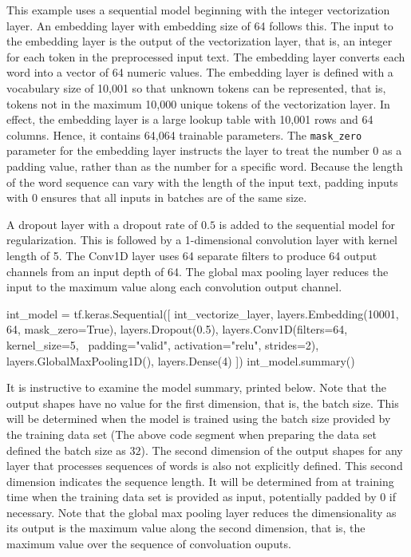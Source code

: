 \begin{withcode}
This example uses a sequential model beginning with the integer vectorization layer. An embedding layer with embedding size of 64 follows this. The input to the embedding layer is the output of the vectorization layer, that is, an integer for each token in the preprocessed input text. The embedding layer converts each word into a vector of 64 numeric values. The embedding layer is defined with a vocabulary size of 10,001 so that unknown tokens can be represented, that is, tokens not in the maximum 10,000 unique tokens of the vectorization layer. In effect, the embedding layer is a large lookup table with 10,001 rows and 64 columns. Hence, it contains 64,064 trainable parameters. The \texttt{mask\_zero} parameter for the embedding layer instructs the layer to treat the number $0$ as a padding value, rather than as the number for a specific word. Because the length of the word sequence can vary with the length of the input text, padding inputs with $0$ ensures that all inputs in batches are of the same size.

A dropout layer with a dropout rate of $0.5$ is added to the sequential model for regularization. This is followed by a 1-dimensional convolution layer with kernel length of 5. The Conv1D layer uses 64 separate filters to produce 64 output channels from an input depth of 64. The global max pooling layer reduces the input to the maximum value along each convolution output channel.

\begin{pythoncode}
int_model = tf.keras.Sequential([
  int_vectorize_layer, 
  layers.Embedding(10001, 64, mask_zero=True),
  layers.Dropout(0.5),
  layers.Conv1D(filters=64, kernel_size=5, \
      padding="valid", activation="relu", strides=2),
  layers.GlobalMaxPooling1D(),
  layers.Dense(4)
  ])
int_model.summary()
\end{pythoncode}

It is instructive to examine the model summary, printed below. Note that the output shapes have no value for the first dimension, that is, the batch size. This will be determined when the model is trained using the batch size provided by the training data set (The above code segment when preparing the data set defined the batch size as $32$). The second dimension of the output shapes for any layer that processes sequences of words is also not explicitly defined. This second dimension indicates the sequence length. It will be determined from at training time when the training data set is provided as input, potentially padded by $0$ if necessary. Note that the global max pooling layer reduces the dimensionality as its output is the maximum value along the second dimension, that is, the maximum value over the sequence of convoluation ouputs. 


\end{withcode}

